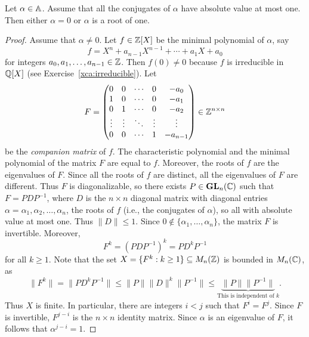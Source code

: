 \begin{theorem}[Kronecker]
\label{thm:Kronecker}
Let $\alpha\in\mathbb{A}$. Assume that all the conjugates of $\alpha$ 
have absolute value at most one. Then either $\alpha=0$ or $\alpha$ is a root of one. 
\end{theorem}

\begin{proof}
    Assume that $\alpha\ne 0$. 
    Let $f\in\mathbb{Z}[X]$ be the minimal polynomial of $\alpha$, say 
    \[
    f=X^n+a_{n-1}X^{n-1}+\cdots+a_1X+a_0
    \]
    for integers $a_0,a_1,\dots,a_{n-1}\in\mathbb{Z}$. Then $f(0)\ne0$ because $f$ is irreducible in $\mathbb{Q}[X]$ (see Exercise~\ref{xca:irreducible}).  
    Let 
    \[
    F=\begin{pmatrix}
        0 & 0 & \cdots & 0 & -a_0\\
        1 & 0 & \cdots & 0 & -a_1\\
        0 & 1 & \cdots & 0 & -a_2\\
        \vdots & \vdots & \ddots & \vdots & \vdots\\
        0 & 0 & \cdots & 1 & -a_{n-1}
    \end{pmatrix}\in\mathbb{Z}^{n\times n}
    \]
    be the \emph{companion matrix} of $f$. The characteristic polynomial and the minimal polynomial of 
    the matrix $F$ are equal to $f$. Moreover, the roots of $f$ are the eigenvalues of $F$. Since 
    all the roots of $f$ are distinct, all the eigenvalues of $F$ are different. Thus 
    $F$ is diagonalizable, so there exists $P\in\mathbf{GL}_n(\mathbb{C})$ such that $F=PDP^{-1}$, where
    $D$ is the $n\times n$ diagonal matrix with diagonal 
    entries $\alpha=\alpha_1,\alpha_2,\dots,\alpha_n$, 
    the roots of $f$ (i.e., the conjugates of $\alpha$), 
    so all with absolute value at most one. Thus 
    $\|D\|\leq 1$. 
    Since $0\not\in\{\alpha_1,\dots,\alpha_n\}$, the matrix
    $F$ is invertible. Moreover, 
    \[
    F^k=(PDP^{-1})^k=PD^kP^{-1}
    \]
    for all $k\geq1$. Note that the set 
    $X=\{F^k:k\geq 1\}\subseteq M_n(\mathbb{Z})$ is bounded in $M_n(\mathbb{C})$, 
    as 
    \[
    \|F^k\|=\|PD^kP^{-1}\|\leq 
    \|P\|\|D\|^k\| P^{-1}\|
    \leq \underbrace{\|P\|\| P^{-1}\|}_{\text{This is independent of $k$}}.
    \]
    Thus $X$ is finite. In particular, there are integers $i<j$ such that 
    $F^i=F^j$. Since $F$ is invertible, $F^{j-i}$ is the $n\times n$ 
    identity matrix. Since $\alpha$ is an eigenvalue of $F$, it follows
    that $\alpha^{j-i}=1$.  
\end{proof}


